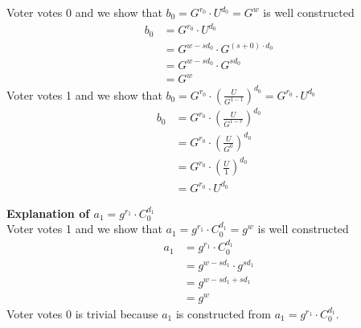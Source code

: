 \noindent
Voter votes 0 and we show that \begin{math}b_0 = G^{r_0} \cdot U^{d_0} = G^w \end{math} is well constructed
\begin{align*}
    b_0 &= G^{r_0} \cdot U^{d_0}                    \\
        &= G^{w-sd_0} \cdot G^{(s+0) \cdot d_{0}}   \\
        &= G^{w-sd_0} \cdot G^{sd_{0}}              \\
        &= G^w                                          
\end{align*}
Voter votes 1 and we show that \begin{math}b_0 = G^{r_0} \cdot (\frac{U}{G^{1-1}})^{d_0}=  G^{r_0} \cdot U^{d_0} \end{math}
\begin{align*}
    b_0 &= G^{r_0} \cdot (\frac{U}{G^{1-v}})^{d_0}  \\
        &= G^{r_0} \cdot (\frac{U}{G^{0}})^{d_0}    \\
        &= G^{r_0} \cdot (\frac{U}{1})^{d_0}        \\
        &= G^{r_0} \cdot U^{d_0}  
\end{align*}



\noindent
\textbf{Explanation of \begin{math}a_1=g^{r_1}  \cdot  C^{d_1}_0\end{math}}\\

\noindent
Voter votes 1 and we show that \begin{math}a_1=g^{r_1}  \cdot  C^{d_1}_0 = g^w \end{math} is well constructed
\begin{align*}
    a_1 &= g^{r_1}  \cdot  C^{d_1}_0    \\
        &= g^{w-sd_1} \cdot  g^{sd_1}   \\
        &= g^{w-sd_1+ sd_1}             \\
        &= g^w
\end{align*}
Voter votes 0 is trivial because \begin{math}a_1 \end{math} is constructed from \begin{math}a_1=g^{r_1}  \cdot  C^{d_1}_0 \end{math}.\\



